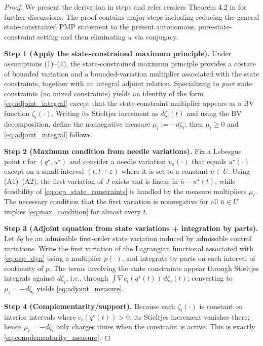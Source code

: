 \begin{proof}
We present the derivation in steps and refer readers Theorem 4.2 in \cite{hartl1995survey} for further discussions. The proof contains major steps including reducing the general state-constrained PMP statement
to the present autonomous, pure-state-constraint setting and then eliminating $u$ via conjugacy.

\smallskip
\noindent\textbf{Step 1 (Apply the state-constrained maximum principle).}
Under assumptions (1)--(4), the state-constrained maximum principle provides a costate of bounded variation and
a bounded-variation multiplier associated with the state constraints, together with an integral adjoint relation.
Specializing to \emph{pure} state constraints (no mixed constraints) yields an identity of the form
\cref{eq:adjoint_integral} except that the state-constraint multiplier appears as a BV function $\zeta_i(\cdot)$.
Writing its Stieltjes increment as $d\zeta_i(t)$ and using the BV decomposition, define the nonnegative measure
$\mu_i := -d\zeta_i$; then $\mu_i\ge 0$ and \cref{eq:adjoint_integral} follows.

\smallskip
\noindent\textbf{Step 2 (Maximum condition from needle variations).}
Fix a Lebesgue point $t$ for $(q^\star,u^\star)$ and consider a needle variation
$u_\varepsilon(\cdot)$ that equals $u^\star(\cdot)$ except on a small interval $(t,t+\varepsilon)$ where it is set
to a constant $\bar u\in U$.
Using (A1)--(A2), the first variation of $J$ exists and is linear in $\bar u-u^\star(t)$, while feasibility of
\cref{eq:ocp_state_constraints} is handled by the measure multipliers $\mu_i$.
The necessary condition that the first variation is nonnegative for all $\bar u\in U$ implies
\cref{eq:max_condition} for almost every $t$.

\smallskip
\noindent\textbf{Step 3 (Adjoint equation from state variations + integration by parts).}
Let $\delta q$ be an admissible first-order state variation induced by admissible control variations.
Write the first variation of the Lagrangian functional associated with \cref{eq:ocp_dyn} using a multiplier $p(\cdot)$,
and integrate by parts on each interval of continuity of $p$.
The terms involving the state constraints appear through Stieltjes integrals against $d\zeta_i$, i.e.,
through $\int \nabla c_i(q^\star(t))\,d\zeta_i(t)$; converting to $\mu_i=-d\zeta_i$ yields \cref{eq:adjoint_measure}.

\smallskip
\noindent\textbf{Step 4 (Complementarity/support).}
Because each $\zeta_i(\cdot)$ is constant on interior intervals where $c_i(q^\star(t))>0$,
its Stieltjes increment vanishes there; hence $\mu_i=-d\zeta_i$ only charges times when the constraint is active.
This is exactly \cref{eq:complementarity_measure}.


\end{proof}
